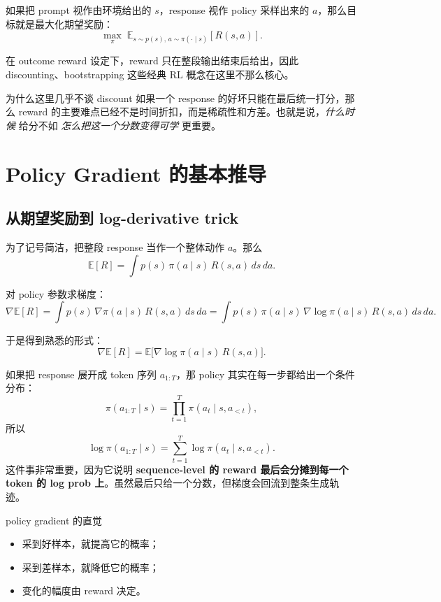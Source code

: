 \documentclass[a4paper]{article}
\begin{document}
如果把 prompt 视作由环境给出的 $s$，response 视作 policy 采样出来的 $a$，那么目标就是最大化期望奖励：
\[
\max_\pi \; \mathbb{E}_{s \sim p(s),\, a \sim \pi(\cdot \mid s)}[R(s,a)].
\]

在 outcome reward 设定下，reward 只在整段输出结束后给出，因此 discounting、bootstrapping 这些经典 RL 概念在这里不那么核心。

\begin{knowledgebox}{为什么这里几乎不谈 discount}
如果一个 response 的好坏只能在最后统一打分，那么 reward 的主要难点已经不是时间折扣，而是稀疏性和方差。也就是说，\emph{什么时候} 给分不如 \emph{怎么把这一个分数变得可学} 更重要。
\end{knowledgebox}


\section{Policy Gradient 的基本推导}

\subsection{从期望奖励到 log-derivative trick}

为了记号简洁，把整段 response 当作一个整体动作 $a$。那么
\[
\mathbb{E}[R] = \int p(s)\,\pi(a \mid s)\,R(s,a)\,ds\,da.
\]

对 policy 参数求梯度：
\[
\nabla \mathbb{E}[R]
= \int p(s)\,\nabla \pi(a \mid s)\,R(s,a)\,ds\,da
= \int p(s)\,\pi(a \mid s)\,\nabla \log \pi(a \mid s)\,R(s,a)\,ds\,da.
\]

于是得到熟悉的形式：
\[
\nabla \mathbb{E}[R] = \mathbb{E}\big[\nabla \log \pi(a \mid s)\,R(s,a)\big].
\]

如果把 response 展开成 token 序列 $a_{1:T}$，那 policy 其实在每一步都给出一个条件分布：
\[
\pi(a_{1:T}\mid s)=\prod_{t=1}^T \pi(a_t \mid s, a_{<t}),
\]
所以
\[
\log \pi(a_{1:T}\mid s)=\sum_{t=1}^T \log \pi(a_t \mid s, a_{<t}).
\]
这件事非常重要，因为它说明 \textbf{sequence-level 的 reward 最后会分摊到每一个 token 的 log prob 上}。虽然最后只给一个分数，但梯度会回流到整条生成轨迹。

\begin{importantbox}{policy gradient 的直觉}
\begin{itemize}
    \item 采到好样本，就提高它的概率；
    \item 采到差样本，就降低它的概率；
    \item 变化的幅度由 reward 决定。
\end{itemize}
\end{importantbox}
\end{document}
